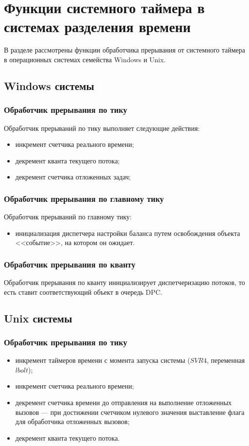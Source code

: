 \chapter{Функции системного таймера \newline в системах разделения времени}
В разделе рассмотрены функции обработчика прерывания от системного таймера в операционных системах семейства Windows и Unix. 

\section{Windows системы}

\subsection{Обработчик прерывания по тику}
Обработчик прерываний по тику выполняет следующие действия:
\begin{itemize}
	\item инкремент счетчика реального времени;
	\item декремент кванта текущего потока;
	\item декремент счетчика отложенных задач;
\end{itemize}
\subsection{Обработчик прерывания по главному тику}

Обработчик прерываний по главному тику:
\begin{itemize}
	\item инициализация диспетчера настройки баланса путем освобождения объекта <<событие>>, на котором он ожидает.
\end{itemize}

\subsection{Обработчик прерывания по кванту}
Обработчик прерывания по кванту инициализирует диспетчеризацию потоков, то есть ставит соответствующий объект в очередь DPC.

\section{Unix системы}
\subsection{Обработчик прерывания по тику}
\begin{itemize}
	\item инкремент таймеров времени с момента запуска системы ($SVR4$, переменная $lbolt$);
	\item инкремент счетчика реального времени;
	\item декремент счетчика времени до отправления на выполнение отложенных вызовов --- при достижении счетчиком нулевого значения выставление флага для обработчика отложенных вызовов; 
	\item декремент кванта текущего потока.
\end{itemize}

